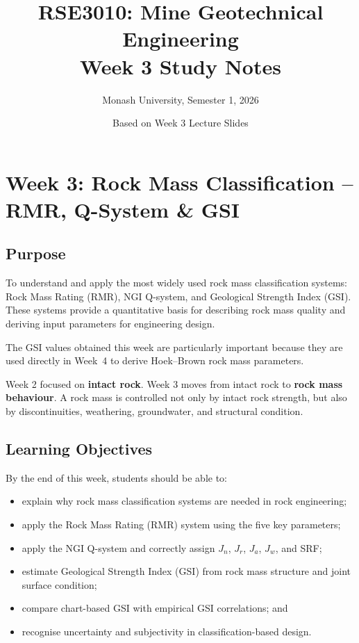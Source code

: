 \documentclass[a4paper,12pt]{article}
\title{\textbf{RSE3010: Mine Geotechnical Engineering}\\Week 3 Study Notes}
\author{Monash University, Semester 1, 2026}
\date{Based on Week 3 Lecture Slides}
\begin{document}
\maketitle

\section{Week 3: Rock Mass Classification -- RMR, Q-System \& GSI}

\subsection{Purpose}

To understand and apply the most widely used rock mass classification systems:
Rock Mass Rating (RMR), NGI Q-system, and Geological Strength Index (GSI).
These systems provide a quantitative basis for describing rock mass quality and
deriving input parameters for engineering design.

The GSI values obtained this week are particularly important because they are used
directly in Week~4 to derive Hoek--Brown rock mass parameters.

\begin{keybox}
Week 2 focused on \textbf{intact rock}. Week 3 moves from intact rock to
\textbf{rock mass behaviour}. A rock mass is controlled not only by intact rock strength,
but also by discontinuities, weathering, groundwater, and structural condition.
\end{keybox}

\subsection{Learning Objectives}

By the end of this week, students should be able to:
\begin{itemize}
    \item explain why rock mass classification systems are needed in rock engineering;
    \item apply the Rock Mass Rating (RMR) system using the five key parameters;
    \item apply the NGI Q-system and correctly assign \(J_n\), \(J_r\), \(J_a\), \(J_w\), and SRF;
    \item estimate Geological Strength Index (GSI) from rock mass structure and joint surface condition;
    \item compare chart-based GSI with empirical GSI correlations; and
    \item recognise uncertainty and subjectivity in classification-based design.
\end{itemize}
\end{document}
